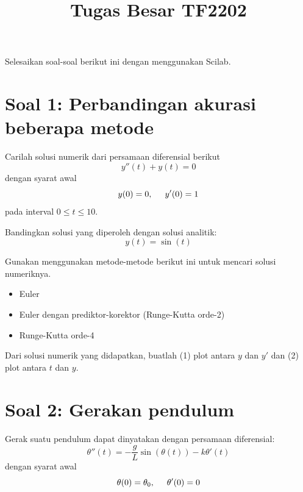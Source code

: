 \documentclass[12pt,bahasa]{article}
\begin{document}
\title{Tugas Besar TF2202}
\date{}
\maketitle


Selesaikan soal-soal berikut ini dengan menggunakan Scilab.

\section{Soal 1: Perbandingan akurasi beberapa metode}

Carilah solusi numerik dari persamaan diferensial berikut
\begin{equation}
y''(t) + y(t) = 0
\end{equation}
dengan syarat awal
\begin{equation}
y(0) = 0, \hspace{0.5cm} y'(0) = 1
\end{equation}
pada interval $0 \leq t \leq 10$.

Bandingkan solusi yang diperoleh dengan solusi analitik:
\begin{equation}
y(t) = \sin(t)
\end{equation}

Gunakan menggunakan metode-metode berikut ini untuk mencari solusi numeriknya.
\begin{itemize}
\item Euler
\item Euler dengan prediktor-korektor (Runge-Kutta orde-2)
\item Runge-Kutta orde-4
\end{itemize}

Dari solusi numerik yang didapatkan, buatlah (1) plot antara $y$ dan $y'$
dan (2) plot antara $t$ dan $y$.

\section{Soal 2: Gerakan pendulum}

Gerak suatu pendulum dapat dinyatakan dengan persamaan diferensial:
\begin{equation}
\theta''(t) = -\frac{g}{L}\sin(\theta(t)) - k\theta'(t)
\end{equation}
dengan syarat awal
\begin{equation}
\theta(0) = \theta_0, \hspace{0.5cm} \theta'(0) = 0
\end{equation}
\end{document}
